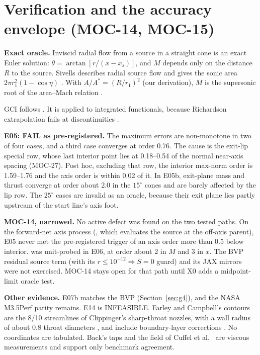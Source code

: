 \section[Verification (MOC-14, MOC-15)]{Verification and the accuracy envelope (MOC-14, MOC-15)}
\label{sec:verification}
\textbf{Exact oracle.} Inviscid radial flow from a source in a straight cone is an
exact Euler solution: $\theta=\arctan[r/(x-x_s)]$, and $M$ depends only on the
distance $R$ to the source. Sivells describes radial source flow and gives the sonic
area $2\pi r_1^2(1-\cos\eta)$ \cite[PDF pp.~8, 16, printed pp.~5, 13, Eq.~17]{sivells1978}.
With $A/A^*=(R/r_1)^2$ (our derivation), $M$ is the supersonic root of the area--Mach
relation \cite[PDF p.~220, printed p.~204, Eq.~5.20]{anderson}.

GCI follows \cite[PDF pp.~5--7, printed pp.~3--5, Eqs.~1--7]{celik2008}. It is applied
to integrated functionals, because Richardson extrapolation fails at discontinuities
\cite{nparcspatial2021}.

\textbf{E05: FAIL as pre-registered.} The maximum errors are non-monotone in two of
four cases, and a third case converges at order 0.76. The cause is the exit-lip special
row, whose last interior point lies at 0.18--0.54 of the normal near-axis spacing
(MOC-27).
Post hoc, excluding that row, the interior max-norm order is 1.59--1.76 and the axis
order is within 0.02 of it. In E05b, exit-plane mass and thrust converge at order about
2.0 in the $15^\circ$ cones and are barely affected by the lip row. The $25^\circ$ cases
are invalid as an oracle, because their exit plane lies partly upstream of the start
line's axis foot.

\textbf{MOC-14, narrowed.} No active defect was found on the two tested paths. On the forward-net axis process
(, which evaluates the source at the off-axis
parent), E05 never met the pre-registered trigger of an axis order more than 0.5 below
interior.  was unit-probed in E06, at order about 2 in $M$ and 3
in $x$. The BVP residual source term  (with its
$r\le10^{-12}\Rightarrow S=0$ guard) and its JAX mirrors were not exercised. MOC-14
stays open for that path until X0 adds a midpoint-limit oracle test.

\textbf{Other evidence.} E07b matches the BVP (Section~\ref{sec:g4}), and the NASA
M3.5Perf parity \cite{rice2003} remains. E14 is INFEASIBLE. Farley and Campbell's
contours are the 8/10 streamlines of Clippinger's sharp-throat nozzles, with a wall
radius of about 0.8 throat diameters \cite[PDF p.~4]{farley1960}, and include
boundary-layer corrections \cite[Fig.~2, PDF p.~19]{farley1960}. No coordinates are
tabulated. Back's taps \cite[PDF pp.~9, 13]{back} and the field of Cuffel et al.\
\cite[PDF pp.~1--2]{cuffel1969} are viscous measurements and support only benchmark
agreement.

